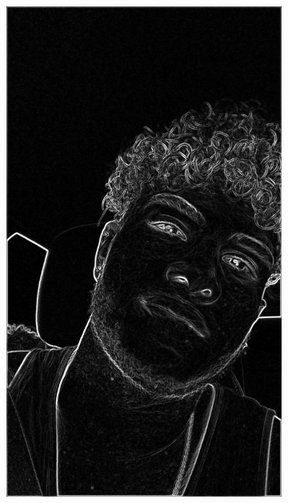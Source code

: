 \documentclass[12pt, a4paper]{article}
\begin{document}
\begin{figure}[!h]
\begin{subfigure}[b]{0.3\textwidth}
  \includegraphics[width=1\textwidth]{report_src/art/fredBlack.jpeg}
\end{subfigure}
\begin{subfigure}[b]{0.3\textwidth}

\end{subfigure}
\end{figure}
\end{document}
